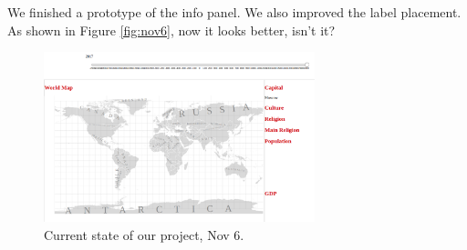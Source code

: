 \documentclass[12pt, fullpage,letterpaper]{article}
\begin{document}
We finished a prototype of the info panel. We also improved the label placement.
As shown in Figure \ref{fig:nov6}, now it looks better, isn't it?

\begin{figure}[h!]
    \begin{center}
        \includegraphics[width=0.7\textwidth]{figs/Nov6.png}
        \caption{Current state of our project, Nov 6.}
        \label{fig:nov5}
    \end{center}
\end{figure}
\end{document}
